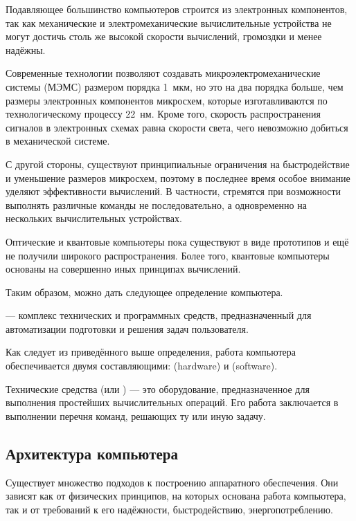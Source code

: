 Подавляющее большинство компьютеров строится из электронных
компонентов, так как механические и электромеханические вычислительные
устройства не могут достичь столь же высокой скорости вычислений,
громоздки и менее надёжны.

Современные технологии позволяют создавать микроэлектромеханические
системы (МЭМС) размером порядка 1~мкм, но это на два порядка больше,
чем размеры электронных компонентов микросхем, которые изготавливаются
по технологическому процессу 22~нм. Кроме того, скорость
распространения сигналов в электронных схемах равна скорости света,
чего невозможно добиться в механической системе.

С другой стороны, существуют принципиальные ограничения на
быстродействие и уменьшение размеров микросхем, поэтому в последнее
время особое внимание уделяют эффективности вычислений. В частности,
стремятся при возможности выполнять различные команды не
последовательно, а одновременно на нескольких вычислительных
устройствах.

Оптические и квантовые компьютеры пока существуют в виде прототипов и
ещё не получили широкого распространения. Более того, квантовые
компьютеры основаны на совершенно иных принципах вычислений.

Таким образом, можно дать следующее определение компьютера.

\begin{defn}
   — комплекс технических и программных
  средств, предназначенный для автоматизации подготовки и решения
  задач пользователя.
\end{defn}

Как следует из приведённого выше определения, работа компьютера
обеспечивается двумя составляющими:
 (hardware) и
 (software).

Технические средства (или ) — это оборудование, предназначенное для выполнения
простейших вычислительных операций. Его работа заключается в
выполнении перечня команд, решающих ту или иную задачу.

\subsection{Архитектура компьютера}

Существует множество подходов к построению аппаратного
обеспечения. Они зависят как от физических принципов, на которых
основана работа компьютера, так и от требований к его надёжности,
быстродействию, энергопотреблению.

